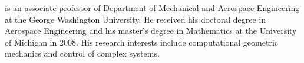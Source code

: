 \documentclass[fleqn]{IJCAS}  %
\begin{document}
\begin{multicols}{2}
    {is an associate professor of Department of Mechanical and Aerospace Engineering at the George Washington University. 
    He received his doctoral degree in Aerospace Engineering and his master's degree in Mathematics at the University of Michigan in 2008. 
    His research interests include computational geometric mechanics and control of complex systems.}    
\clearafterbiography\relax
\clearafterbiography\relax
\end{multicols}
\end{document}
